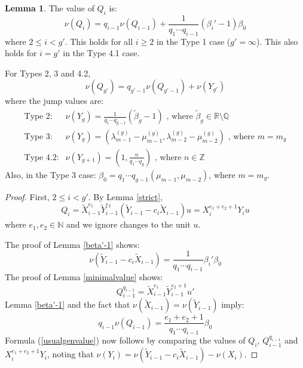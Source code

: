 \documentclass[11pt]{amsart}
\theoremstyle{definition}
\newtheorem{lem}[thm]{Lemma}
\begin{document}
{\begin{lem} \label{genvalue}
The value of $Q_i$ is:
\begin{equation} \label{usualgenvalue}
\nu(Q_i)=q_{i-1}\nu(Q_{i-1})+\frac{1}{q_1 \cdots q_{i-1}}(\beta_i'-1)\beta_0
\end{equation}
where $2\leq i < g'$. This holds for all $i\geq 2$ in the Type 1 case ($g'=\infty$). This also holds for $i=g'$ in the Type 4.1 case.

For Types 2, 3 and 4.2,
\begin{equation*}
\nu(Q_{g'})=q_{g'-1} \nu(Q_{g'-1})+\nu(Y_{g'})
\end{equation*}
where the jump values are:
\begin{equation*}
\begin{array}{ll}
\text{Type 2:} & \displaystyle \nu(Y_g)= \frac{1}{q_1\cdots q_{g-1}}\left(\tilde \beta_g -1\right) \text{ , where } \tilde \beta_{g}\in\mathbb{R}\setminus\mathbb{Q} \\
\text{Type 3:} & \displaystyle \nu(Y_g)= \left(\lambda_{m-1}^{(g)}-\mu_{m-1}^{(g)},\lambda_{m-2}^{(g)}-\mu_{m-2}^{(g)}\right) \text{ , where } m=m_g \\
\text{Type 4.2:} & \displaystyle \nu(Y_{g+1})=\left(1,\frac{n}{q_1 \cdots q_g}\right) \text{ , where } n\in\mathbb{Z}
\end{array}
\end{equation*}
Also, in the Type 3 case: $\beta_0=q_1\cdots q_{g-1}(\mu_{m-1},\mu_{m-2})$, where $m=m_g$.
\end{lem}
\begin{proof}
First, $2\leq i < g'$. By Lemma \ref{strict},
\begin{equation*}
Q_i=\tilde X_{i-1}^{e_1}\tilde Y_{i-1}^{e_2}\left(\tilde Y_{i-1}-c_i\tilde X_{i-1}\right)u=X_i^{e_1+e_2+1}Y_iu
\end{equation*}
where $e_1,e_2\in\mathbb{N}$ and we ignore changes to the unit $u$.

The proof of Lemma \ref{beta'-1} shows:
\begin{equation*}
\nu(\tilde Y_{i-1}-c_i\tilde X_{i-1})=\frac{1}{q_1 \cdots q_{i-1}}\beta_i'\beta_0
\end{equation*}
The proof of Lemma \ref{minimalvalue} shows:
\begin{equation*}
Q_{i-1}^{q_{i-1}}=\tilde X_{i-1}^{e_1} \tilde Y_{i-1}^{e_2+1}u'
\end{equation*}
Lemma \ref{beta'-1} and the fact that $\nu(\tilde X_{i-1})=\nu(\tilde Y_{i-1})$ imply:
\begin{equation*}
q_{i-1}\nu(Q_{i-1})=\frac{e_1+e_2+1}{q_1\cdots q_{i-1}}\beta_0
\end{equation*}
Formula (\ref{usualgenvalue}) now follows by comparing the values of $Q_i$, $Q_{i-1}^{q_{i-1}}$ and $X_i^{e_1+e_2+1}Y_i$, noting that $\nu(Y_i)=\nu(\tilde Y_{i-1}-c_i\tilde X_{i-1})-\nu(X_i)$.


\end{proof}}
\end{document}

